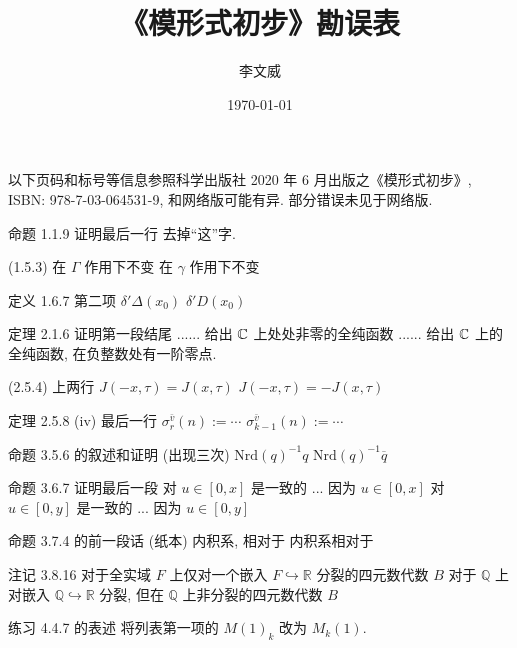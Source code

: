 \documentclass{AJerrata}
\title{\bfseries 《模形式初步》勘误表}
\author{李文威}
\date{\today}
\begin{document}
	\maketitle
	以下页码和标号等信息参照科学出版社 2020 年 6 月出版之《模形式初步》, ISBN: 978-7-03-064531-9, 和网络版可能有异. 部分错误未见于网络版.
	
	\begin{Errata}
		\item[命题 1.1.9 证明最后一行]
		去掉``这''字.
		
		\item[(1.5.3)]
		\Orig 在 $\Gamma$ 作用下不变
		\Corr 在 $\gamma$ 作用下不变
		
		\item[定义 1.6.7 第二项]
		\Orig $\delta' \Delta(x_0)$
		\Corr $\delta' D(x_0)$
		
		\item[定理 2.1.6 证明第一段结尾]
		\Orig ...... 给出 $\mathbb{C}$ 上处处非零的全纯函数
		\Corr ...... 给出 $\mathbb{C}$ 上的全纯函数, 在负整数处有一阶零点. 

		\item[(2.5.4) 上两行]
		\Orig $J(-x, \tau) = J(x, \tau)$
		\Corr $J(-x, \tau) = -J(x, \tau)$

        \item[定理 2.5.8 (iv) 最后一行]
        \Orig $\sigma^{\bar{v}}_r(n) := \cdots$
        \Corr $\sigma^{\bar{v}}_{k-1}(n) := \cdots$
		
		\item[命题 3.5.6 的叙述和证明 (出现三次)]
		\Orig $\mathrm{Nrd}(q)^{-1} q$
		\Corr $\mathrm{Nrd}(q)^{-1} \overline{q}$ 
		
		\item[命题 3.6.7 证明最后一段]
		\Orig 对 $u \in [0,x]$ 是一致的 ... 因为 $u \in [0,x]$
		\Corr 对 $u \in [0,y]$ 是一致的 ... 因为 $u \in [0,y]$
		
		\item[命题 3.7.4 的前一段话 (纸本)]
		\Orig 内积系, 相对于
		\Corr 内积系相对于
		
		\item[注记 3.8.16]
		\Orig 对于全实域 $F$ 上仅对一个嵌入 $F \hookrightarrow \mathbb{R}$ 分裂的四元数代数 $B$
		\Corr 对于 $\mathbb{Q}$ 上对嵌入 $\mathbb{Q} \hookrightarrow \mathbb{R}$ 分裂, 但在 $\mathbb{Q}$ 上非分裂的四元数代数 $B$ 
		
		\item[练习 4.4.7 的表述]
		将列表第一项的 $M(1)_k$ 改为 $M_k(1)$.
		

\end{Errata}
\end{document}

